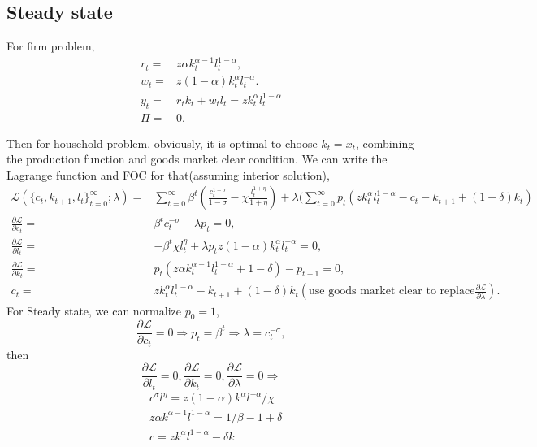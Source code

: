 \documentclass[12pt,notitlepage]{article}%
\numberwithin{equation}{section}
\begin{document}
		\subsection{Steady state}
			For firm problem,
			\begin{equation}
			\begin{split}
				r_t =&z\alpha k_t^{\alpha -1}l_t^{1-\alpha},\\
				w_t =&z(1-\alpha) k_t^{\alpha}l_t^{-\alpha}.\\
				y_t=&r_tk_t+w_tl_t=zk_t^{\alpha}l_t^{1-\alpha}\\
				\Pi =&0.
			\end{split}
			\end{equation}
			
			Then for household problem, obviously, it is optimal to choose $k_t=x_t$, combining the production function and goods market clear condition. We can write the Lagrange function and FOC for that(assuming interior solution),
			\begin{equation}
			\begin{split}
				\mathcal{L}(\{c_t,k_{t+1},l_t\}_{t=0}^{\infty};\lambda)=&\sum_{t=0}^{\infty}
				\beta ^t(\frac{c_t^{1-\sigma}}{1-\sigma}-\chi \frac{l_t^{1+\eta}}{1+\eta})+\lambda(\sum_{t=0}^{\infty}p_t(zk_t^{\alpha}l_t^{1-\alpha}-c_t-k_{t+1}+(1-\delta)k_t)\\
				\frac{\partial \mathcal{L}}{\partial c_t}=&\beta^tc_t^{-\sigma}-\lambda p_t=0,\\
				\frac{\partial \mathcal{L}}{\partial l_t}=&-\beta^t\chi l_t^{\eta}+\lambda p_tz(1-\alpha) k_t^{\alpha}l_t^{-\alpha}=0,\\
				\frac{\partial \mathcal{L}}{\partial k_t}=&p_t(z\alpha k_t^{\alpha -1}l_t^{1-\alpha}+1-\delta)-p_{t-1}=0,\\
				c_t=&zk_t^{\alpha}l_t^{1-\alpha}-k_{t+1}+(1-\delta)k_t(\text{use goods market clear to replace}\frac{\partial \mathcal{L}}{\partial \lambda}).
			\end{split}
			\end{equation}
			For Steady state, we can normalize $p_0=1$, $$\frac{\partial \mathcal{L}}{\partial c_t}=0 \Rightarrow p_t=\beta^t\Rightarrow \lambda =c_t^{-\sigma},$$ 
			then $$\frac{\partial \mathcal{L}}{\partial l_t}=0,\frac{\partial \mathcal{L}}{\partial k_t}=0,\frac{\partial \mathcal{L}}{\partial \lambda}=0  \Rightarrow$$
			\begin{equation}\label{ssfoc}
			\begin{split}
				&c^{\sigma} l^{\eta}=
				z(1-\alpha)k^{\alpha}l^{-\alpha}/\chi\\
				&z\alpha k^{\alpha -1}l^{1-\alpha}=
				1/\beta -1 +\delta\\
				&c=zk^{\alpha}l^{1-\alpha}-\delta k
			\end{split}
			\end{equation}	
\end{document}
